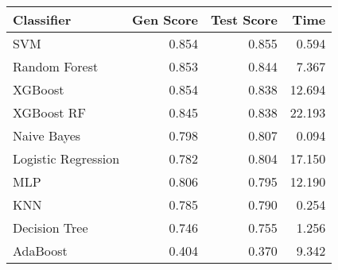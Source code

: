 \begin{tabular}{lrrr}
\toprule
Classifier & Gen Score & Test Score & Time \\
\midrule
SVM & 0.854 & 0.855 & 0.594 \\
Random Forest & 0.853 & 0.844 & 7.367 \\
XGBoost & 0.854 & 0.838 & 12.694 \\
XGBoost RF & 0.845 & 0.838 & 22.193 \\
Naive Bayes & 0.798 & 0.807 & 0.094 \\
Logistic Regression & 0.782 & 0.804 & 17.150 \\
MLP & 0.806 & 0.795 & 12.190 \\
KNN & 0.785 & 0.790 & 0.254 \\
Decision Tree & 0.746 & 0.755 & 1.256 \\
AdaBoost & 0.404 & 0.370 & 9.342 \\
\bottomrule
\end{tabular}
